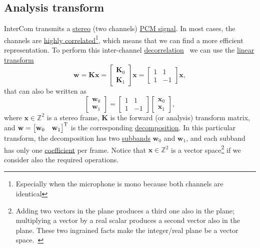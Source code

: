 \subsection{Analysis transform}
InterCom transmits a
\href{https://en.wikipedia.org/wiki/Stereophonic_sound}{stereo} (two
channels)
\href{https://en.wikipedia.org/wiki/Pulse-code_modulation}{PCM
  signal}. In most cases, the channels are
\href{https://en.wikipedia.org/wiki/Binaural_recording}{highly
  correlated}\footnote{Especially when the microphone is mono because both
channels are identical}, which means that we can find a more efficient
representation. To perform this inter-channel
\href{https://en.wikipedia.org/wiki/Decorrelation}{decorrelation}~\cite{thinkstats}
we can use the \href{https://en.wikipedia.org/wiki/Linear_map}{linear
  transform}~\cite{strang4linear}
\begin{equation}
  {\mathbf w} = {\mathbf K}{\mathbf x} =
\begin{bmatrix} \mathbf{K}_0 \\ \mathbf{K}_1 \end{bmatrix}{\mathbf x} =
\begin{bmatrix} 1 & 1 \\ 1 & -1 \end{bmatrix}
{\mathbf x},
  \label{eq:forward_transform_matrix_form}
\end{equation}
that can also be written as
\begin{equation}
  \begin{bmatrix}
    {\mathbf w}_0 \\
    {\mathbf w}_1
  \end{bmatrix}
  = 
  \begin{bmatrix} 1 & 1 \\ 1 & -1 \end{bmatrix}
  \begin{bmatrix}
    {\mathbf x}_0 \\
    {\mathbf x}_1
  \end{bmatrix},
  \label{eq:forward_transform_matrix_form2}
\end{equation}
where ${\mathbf x}\in\mathbb{Z}^2$ is a stereo frame, ${\mathbf K}$ is
the forward (or analysis) transform matrix, and
${\mathbf w}=\begin{bmatrix} {\mathbf w}_0 & {\mathbf
    w}_1\end{bmatrix}^{\text T}$ is the corresponding
\href{https://en.wikipedia.org/wiki/Discrete_wavelet_transform}{decomposition}. In
this particular transform, the decomposition has two
\href{https://en.wikipedia.org/wiki/Sub-band_coding}{subbands}
${\mathbf w}_0$ and ${\mathbf w}_1$, and each subband has only one
\href{https://web.stanford.edu/class/ee398a/handouts/lectures/07-TransformCoding.pdf}{coefficient} per frame. Notice
that ${\mathbf x}\in\mathbb{Z}^2$ is a vector space\footnote{Adding
  two vectors in the plane produces a third one also in the plane;
  multiplying a vector by a real scalar produces a second vector also
  in the plane. These two ingrained facts make the integer/real plane be a
  vector space.~\cite{vetterli2014foundations}} if we consider also
the required operations.

